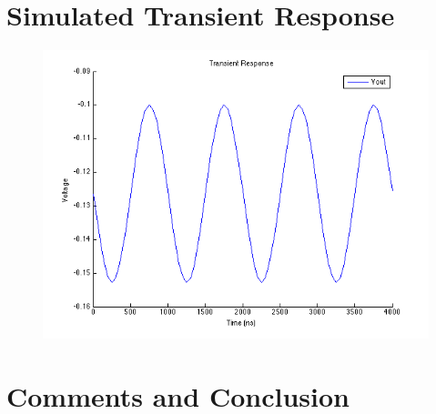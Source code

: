 \documentclass[12pt,a4paper]{article}
\begin{document}


\section{Simulated Transient Response}
\begin{figure}[h]
\centering
\includegraphics[scale=.75]{transient_response.png}
\end{figure}

\pagebreak




\section{Comments and Conclusion}
\end{document}
